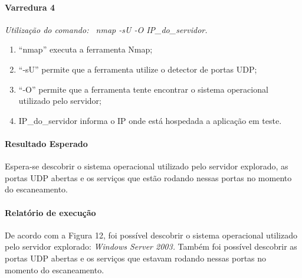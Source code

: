 \documentclass[
    12pt,               %
    openright,          %
    oneside,            %
    a4paper,            %
    section=TITLE,     %
    english,            %
    french,             %
    spanish,            %
    brazil              %
    ]{abntex2}
\begin{document}
\paragraph*{Varredura 4}

\emph{Utilização do comando: ~nmap -sU -O IP\_do\_servidor.}



\begin{enumerate}[start=1]
	
\item \textquotedblleft{}nmap\textquotedblright{} executa a ferramenta Nmap;
	
\item \textquotedblleft{}-sU\textquotedblright{} permite que a ferramenta utilize o detector de portas UDP;
	
\item \textquotedblleft{}-O\textquotedblright{} permite que a ferramenta tente encontrar o sistema operacional utilizado pelo servidor;
	
\item IP\_do\_servidor informa o IP onde está hospedada a aplicação em teste.

\end{enumerate}


\paragraph*{Resultado Esperado}

Espera-se descobrir o sistema operacional utilizado pelo servidor explorado, as portas UDP abertas e os serviços que estão rodando nessas portas no momento do escaneamento.








\paragraph*{Relatório de execução}

De acordo com a Figura 12, foi possível descobrir o sistema operacional utilizado pelo servidor explorado: \emph{Windows Server 2003.} Também foi possível descobrir as portas UDP abertas e os serviços que estavam rodando nessas portas no momento do escaneamento.
\end{document}
